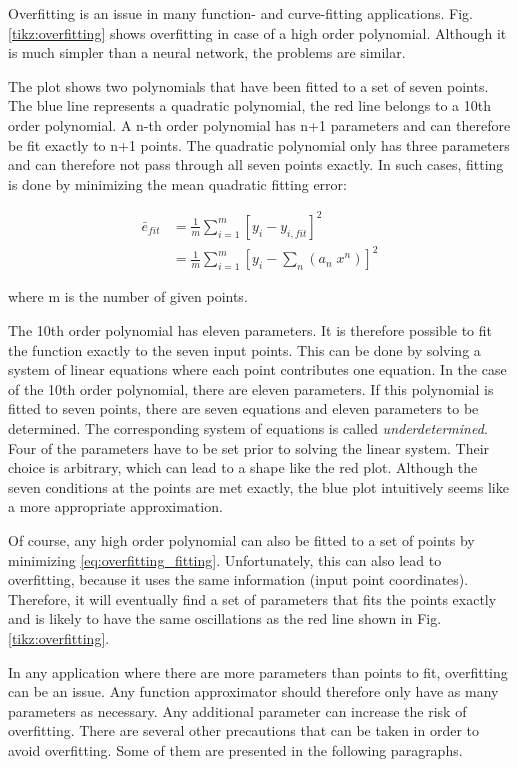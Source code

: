 Overfitting is an issue in many function- and curve-fitting applications. Fig. \ref{tikz:overfitting} shows overfitting in case of a high order polynomial. Although it is much simpler than a neural network, the problems are similar.

The plot shows two polynomials that have been fitted to a set of seven points. The blue line represents a quadratic polynomial, the red line belongs to a 10th order polynomial. A n-th order polynomial has n+1 parameters and can therefore be fit exactly to n+1 points. The quadratic polynomial only has three parameters and can therefore not pass through all seven points exactly. In such cases, fitting is done by minimizing the mean quadratic fitting error: 

\begin{align}
\bar{e}_{fit}&=\frac{1}{m}\sum_{i=1}^{m}[y_i-y_{i,fit}]^2 \\
&=\frac{1}{m}\sum_{i=1}^{m}[y_i-\sum_n (a_n\;x^n)]^2
\label{eq:overfitting_fitting}
\end{align}

where m is the number of given points. 

The 10th order polynomial has eleven parameters. It is therefore possible to fit the function exactly to the seven input points. This can be done by solving a system of linear equations where each point contributes one equation. In the case of the 10th order polynomial, there are eleven parameters. If this polynomial is fitted to seven points, there are seven equations and eleven parameters to be determined. The corresponding system of equations is called \textit{underdetermined}. Four of the parameters have to be set prior to solving the linear system. Their choice is arbitrary, which can lead to a shape like the red plot. Although the seven conditions at the points are met exactly, the blue plot intuitively seems like a more appropriate approximation.

Of course, any high order polynomial can also be fitted to a set of points by minimizing \ref{eq:overfitting_fitting}. Unfortunately, this can also lead to overfitting, because it uses the same information (input point coordinates). Therefore, it will eventually find a set of parameters that fits the points exactly and is likely to have the same oscillations as the red line shown in Fig. \ref{tikz:overfitting}.

In any application where there are more parameters than points to fit, overfitting can be an issue. Any function approximator should therefore only have as many parameters as necessary. Any additional parameter can increase the risk of overfitting. There are several other precautions that can be taken in order to avoid overfitting. Some of them are presented in the following paragraphs. \bigbreak


